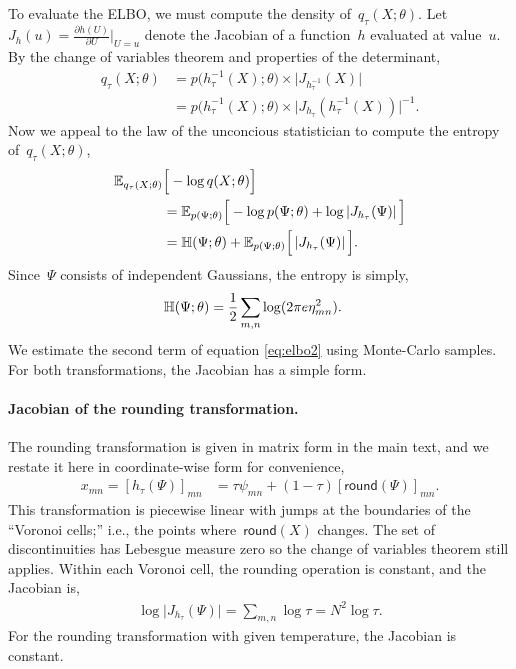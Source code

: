 To evaluate the ELBO, we must compute the density
of~$q_\tau(X; \theta)$.
Let~${J_h(u) = \frac{\partial h(U)}{\partial U} \big|_{U=u}}$ denote
the Jacobian of a function~$h$ evaluated at value~$u$. By the change
of variables theorem and properties of the determinant,
\begin{align*}
  q_\tau(X; \theta)
  &= p \big(h_\tau^{-1}(X) ;\theta \big)
    \times \big| J_{h_\tau^{-1}}(X) \big|
  \\
  &= p \big(h_\tau^{-1}(X); \theta \big)
    \times \big| J_{h_\tau}(h_\tau^{-1}(X)) \big|^{-1}.
\end{align*}
Now we appeal to the law of the unconcious statistician to compute
the entropy of~$q_\tau(X; \theta)$,
\begin{align}
  \label{eq:elbo2}
  \nonumber \mathbb{E}_{q_\tau(X; \theta)} & \Big[- \log q(X; \theta) \Big] \\
  \nonumber &= \mathbb{E}_{p(\Psi;\theta)}
              \Big[ - \log p(\Psi;\theta) +
              \log \left| J_{h_\tau}(\Psi) \right| \Big] \\
  &= \mathbb{H}(\Psi; \theta)  +
  \mathbb{E}_{p(\Psi;\theta)} \Big[ \left| J_{h_\tau}(\Psi) \right| \Big].
\end{align}
Since~$\Psi$ consists of independent Gaussians, the entropy is simply,
\begin{align*}
  \mathbb{H}(\Psi; \theta) &=  \frac{1}{2} \sum_{m,n} \log(2 \pi e \eta_{mn}^2).
\end{align*}
We estimate the second term of equation \eqref{eq:elbo2} using
Monte-Carlo samples. For both transformations, the Jacobian has a
simple form.

\paragraph{Jacobian of the rounding transformation.}
The rounding transformation is given in matrix form
in the main text, and we restate it here in coordinate-wise form
for convenience,
\begin{align*}
  x_{mn} = [h_\tau(\Psi)]_{mn} &= \tau \psi_{mn} + (1-\tau) [\mathsf{round}(\Psi)]_{mn}.
\end{align*}
This transformation is piecewise linear with jumps at the boundaries
of the ``Voronoi cells;'' i.e., the points where~$\mathsf{round}(X)$
changes. The set of discontinuities has Lebesgue measure zero so the
change of variables theorem still applies.  Within each Voronoi cell,
the rounding operation is constant, and the Jacobian is,
\begin{align*}
  \log \big| J_{h_\tau}(\Psi) \big| = \sum_{m,n} \log \tau = N^2 \log \tau.
\end{align*}
For the rounding transformation with given temperature, the Jacobian
is constant.

